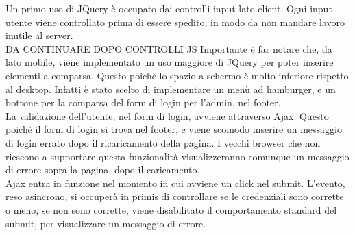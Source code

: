 Un primo uso di JQuery è occupato dai controlli input lato client. Ogni input utente viene controllato prima di essere spedito, in modo da non mandare lavoro inutile al server.\\
DA CONTINUARE DOPO CONTROLLI JS
Importante è far notare che, da lato mobile, viene implementato un uso maggiore di JQuery per poter inserire elementi a comparsa. Questo poichè lo spazio a schermo è molto inferiore
rispetto al desktop. Infatti è stato scelto di implementare un menù ad hamburger, e un bottone per la comparsa del form di login per l'admin, nel footer.\\

La validazione dell'utente, nel form di login, avviene attraverso Ajax. Questo poichè il form di login si trova nel footer, e viene scomodo inserire un messaggio di login
errato dopo il ricaricamento della pagina. I vecchi browser che non riescono a supportare questa funzionalità visualizzeranno comunque un messaggio di errore sopra la pagina, dopo
il caricamento.\\
Ajax entra in funzione nel momento in cui avviene un click nel submit. L'evento, reso asincrono, si occuperà in primis di controllare se le credenziali sono corrette o meno,
se non sono corrette, viene disabilitato il comportamento standard del submit, per visualizzare un messaggio di errore.\\